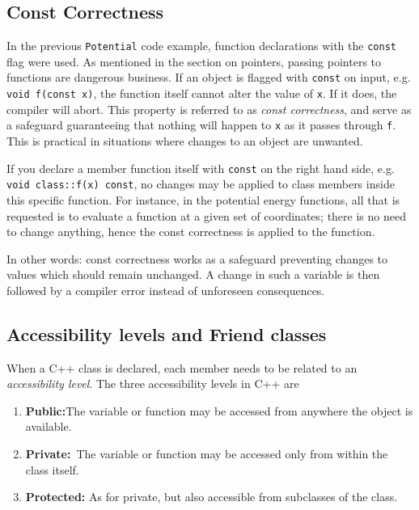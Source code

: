 \subsection{Const Correctness}

In the previous \verb+Potential+ code example, function declarations with the \verb+const+ flag were used. As mentioned in the section on pointers, passing pointers to functions are dangerous business. If an object is flagged with \verb+const+ on input, e.g. \verb+void f(const x)+, the function itself cannot alter the value of \verb+x+. If it does, the compiler will abort. This property is referred to as \textit{const correctness}, and serve as a safeguard guaranteeing that nothing will happen to \verb+x+ as it passes through \verb+f+. This is practical in situations where changes to an object are unwanted.

If you declare a member function itself with \verb+const+ on the right hand side, e.g. \verb+void class::f(x) const+, no changes may be applied to class members inside this specific function. For instance, in the potential energy functions, all that is requested is to evaluate a function at a given set of coordinates; there is no need to change anything, hence the const correctness is applied to the function. 

In other words: const correctness works as a safeguard preventing changes to values which should remain unchanged. A change in such a variable is then followed by a compiler error instead of unforeseen consequences.

\subsection{Accessibility levels and Friend classes}

When a C++ class is declared, each member needs to be related to an \textit{accessibility level}. The three accessibility levels in C++ are 

\begin{enumerate}[label=\textbf{(\roman{*})}, ref=(\roman{*}), align=left]
 \item \textbf{Public:}\qquad The variable or function may be accessed from anywhere the object is available.
 \item \textbf{Private:}\quad\, The variable or function may be accessed only from within the class itself. 
 \item \textbf{Protected:} As for private, but also accessible from subclasses of the class.
 \label{enum:accessibilityLevels}
 \vspace{0.3cm}
\end{enumerate}

